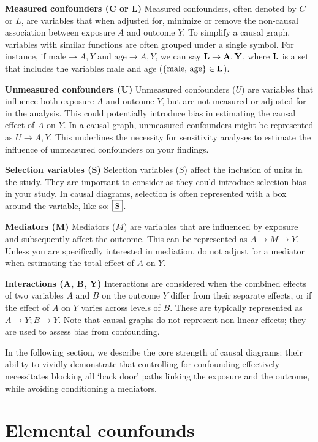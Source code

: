 \documentclass[
  singlecolumn]{report}
\begin{document}
\textbf{Measured confounders (C or L)} Measured confounders, often
denoted by \(C\) or \(L\), are variables that when adjusted for,
minimize or remove the non-causal association between exposure \(A\) and
outcome \(Y\). To simplify a causal graph, variables with similar
functions are often grouped under a single symbol. For instance, if
\(\text{male} \to A, Y\) and \(\text{age} \to A, Y\), we can say
\(\bf{L} \to A, Y\), where \(\bf{L}\) is a set that includes the
variables \(\text{male}\) and \(\text{age}\)
(\(\{\text{male, age}\}\in \bf{L}\)).

\textbf{Unmeasured confounders (U)} Unmeasured confounders (\(U\)) are
variables that influence both exposure \(A\) and outcome \(Y\), but are
not measured or adjusted for in the analysis. This could potentially
introduce bias in estimating the causal effect of \(A\) on \(Y\). In a
causal graph, unmeasured confounders might be represented as
\(U \to A, Y\). This underlines the necessity for sensitivity analyses
to estimate the influence of unmeasured confounders on your findings.

\textbf{Selection variables (S)} Selection variables (\(S\)) affect the
inclusion of units in the study. They are important to consider as they
could introduce selection bias in your study. In causal diagrams,
selection is often represented with a box around the variable, like so:
\(\framebox{S}\).

\textbf{Mediators (M)} Mediators (\(M\)) are variables that are
influenced by exposure and subsequently affect the outcome. This can be
represented as \(A \to M \to Y\). Unless you are specifically interested
in mediation, do not adjust for a mediator when estimating the total
effect of \(A\) on \(Y\).

\textbf{Interactions (A, B, Y)} Interactions are considered when the
combined effects of two variables \(A\) and \(B\) on the outcome \(Y\)
differ from their separate effects, or if the effect of \(A\) on \(Y\)
varies across levels of \(B\). These are typically represented as
\(A \to Y; B \to Y\). Note that causal graphs do not represent
non-linear effects; they are used to assess bias from confounding.

In the following section, we describe the core strength of causal
diagrams: their ability to vividly demonstrate that controlling for
confounding effectively necessitates blocking all `back door' paths
linking the exposure and the outcome, while avoiding conditioning a
mediators.

\hypertarget{elemental-counfounds}{%
\section{Elemental counfounds}\label{elemental-counfounds}}
\end{document}
